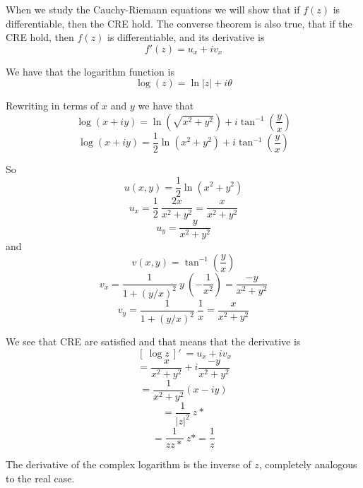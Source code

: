 \documentclass[11pt, oneside]{article}
\begin{document}
When we study the Cauchy-Riemann equations we will show that if $f(z)$ is differentiable, then the CRE hold.  The converse theorem is also true, that if the CRE hold, then $f(z)$ is differentiable, and its derivative is
\[ f'(z) = u_x + i v_x \]

We have that the logarithm function is
\[ \log(z) = \ln |z| + i \theta \]

Rewriting in terms of $x$ and $y$ we have that
\[ \log (x+iy) = \ln (\sqrt{x^2 + y^2}) + i \tan^{-1} (\frac{y}{x}) \]
\[ \log (x+iy) = \frac{1}{2} \ln (x^2 + y^2) + i \tan^{-1} (\frac{y}{x}) \]

So
\[ u(x,y) = \frac{1}{2} \ln (x^2 + y^2) \]
\[ u_x = \frac{1}{2} \ \frac{2x}{x^2 + y^2} = \frac{x}{x^2 + y^2} \]
\[ u_y = \frac{y}{x^2 + y^2} \]
and 
\[ v(x,y) = \tan^{-1} (\frac{y}{x}) \]
\[ v_x = \frac{1}{1 + (y/x)^2} \ y \ (-\frac{1}{x^2}) = \frac{-y}{x^2 + y^2} \]
\[ v_y = \frac{1}{1 + (y/x)^2} \ \frac{1}{x} = \frac{x}{x^2 + y^2} \]

We see that CRE are satisfied and that means that the derivative is
\[ \ [ \ \log z \ ] ' \ = u_x + i v_x \]
\[ = \frac{x}{x^2 + y^2} + i \frac{-y}{x^2 + y^2} \] 
\[ = \frac{1}{x^2 + y^2} (x - i y) \]
\[ = \frac{1}{|z|^2} \ z* \]
\[ =  \frac{1}{zz*} \ z* = \frac{1}{z} \]

The derivative of the complex logarithm is the inverse of $z$, completely analogous to the real case.
\end{document}
